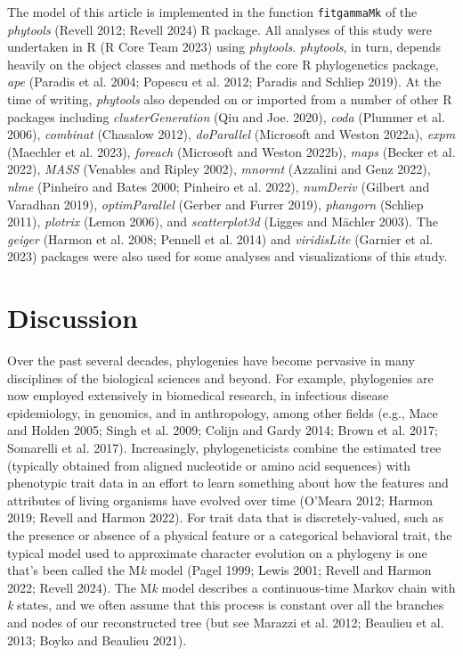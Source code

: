 \documentclass[fleqn,10pt,lineno]{wlpeerj} %
\begin{document}
The model of this article is implemented in the function \texttt{fitgammaMk} of the \emph{phytools} (Revell 2012; Revell 2024) R package. All analyses of this study were undertaken in R (R Core Team 2023) using \emph{phytools}. \emph{phytools}, in turn, depends heavily on the object classes and methods of the core R phylogenetics package, \emph{ape} (Paradis et al. 2004; Popescu et al. 2012; Paradis and Schliep 2019). At the time of writing, \emph{phytools} also depended on or imported from a number of other R packages including \emph{clusterGeneration} (Qiu and Joe. 2020), \emph{coda} (Plummer et al. 2006), \emph{combinat} (Chasalow 2012), \emph{doParallel} (Microsoft and Weston 2022a), \emph{expm} (Maechler et al. 2023), \emph{foreach} (Microsoft and Weston 2022b), \emph{maps} (Becker et al. 2022), \emph{MASS} (Venables and Ripley 2002), \emph{mnormt} (Azzalini and Genz 2022), \emph{nlme} (Pinheiro and Bates 2000; Pinheiro et al. 2022), \emph{numDeriv} (Gilbert and Varadhan 2019), \emph{optimParallel} (Gerber and Furrer 2019), \emph{phangorn} (Schliep 2011), \emph{plotrix} (Lemon 2006), and \emph{scatterplot3d} (Ligges and Mächler 2003). The \emph{geiger} (Harmon et al. 2008; Pennell et al. 2014) and \emph{viridisLite} (Garnier et al. 2023) packages were also used for some analyses and visualizations of this study.

\section{Discussion}\label{discussion}

Over the past several decades, phylogenies have become pervasive in many disciplines of the biological sciences and beyond. For example, phylogenies are now employed extensively in biomedical research, in infectious disease epidemiology, in genomics, and in anthropology, among other fields (e.g., Mace and Holden 2005; Singh et al. 2009; Colijn and Gardy 2014; Brown et al. 2017; Somarelli et al. 2017). Increasingly, phylogeneticists combine the estimated tree (typically obtained from aligned nucleotide or amino acid sequences) with phenotypic trait data in an effort to learn something about how the features and attributes of living organisms have evolved over time (O'Meara 2012; Harmon 2019; Revell and Harmon 2022). For trait data that is discretely-valued, such as the presence or absence of a physical feature or a categorical behavioral trait, the typical model used to approximate character evolution on a phylogeny is one that's been called the M\emph{k} model (Pagel 1999; Lewis 2001; Revell and Harmon 2022; Revell 2024). The M\emph{k} model describes a continuous-time Markov chain with \emph{k} states, and we often assume that this process is constant over all the branches and nodes of our reconstructed tree (but see Marazzi et al. 2012; Beaulieu et al. 2013; Boyko and Beaulieu 2021).
\end{document}

